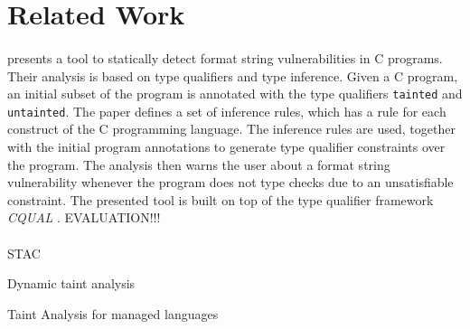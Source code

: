 \section{Related Work}

\paragraph{\cite{Shankar:2001:DFS}} presents a tool to statically
detect format string vulnerabilities in C programs. Their analysis
is based on type qualifiers and type inference. Given a C program,
an initial subset of the program is annotated with the type qualifiers
\texttt{tainted} and \texttt{untainted}. The paper defines a set
of inference rules, which has a rule for each construct of
the C programming language. The inference rules are used, together
with the initial program annotations to generate type qualifier
constraints over the program. The analysis then warns the user
about a format string vulnerability whenever the program does not
type checks due to an unsatisfiable constraint. The presented tool
is built on top of the type qualifier framework \textit{CQUAL} 
\cite{Foster:pldi99}.
EVALUATION!!!

\paragraph{\cite{Jovanovic:2006:Pixy}} STAC

Dynamic taint analysis

Taint Analysis for managed languages